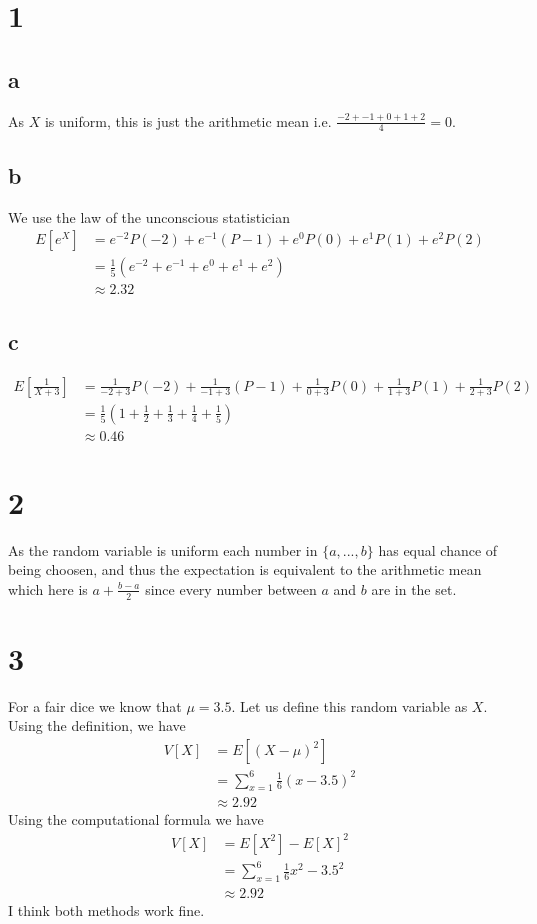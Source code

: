 \documentclass[10pt]{article}
\begin{document}
\section*{1}
\subsection*{a}
As $X$ is uniform, this is just the arithmetic mean i.e. $\frac{-2+-1+0+1+2}{4}=0.$

\subsection*{b}
We use the law of the unconscious statistician
\begin{align*}
    E[e^X] &= e^{-2}P(-2) + e^{-1}(P-1) + e^0P(0) + e^1P(1) + e^2P(2)\\
    &=\frac{1}{5}(e^{-2}+e^{-1}+e^0+e^1+e^2)\\
    &\approx 2.32
\end{align*}

\subsection*{c}

\begin{align*}
    E[\frac{1}{X+3}] &= \frac{1}{-2+3}P(-2) + \frac{1}{-1+3}(P-1) + \frac{1}{0+3}P(0) + \frac{1}{1+3}P(1) + \frac{1}{2+3}P(2)\\
    &=\frac{1}{5}(1 + \frac{1}{2}+\frac{1}{3}+\frac{1}{4}+\frac{1}{5})\\
    &\approx 0.46
\end{align*}

\section*{2}

As the random variable is uniform each number in $\{a,...,b\}$ has equal chance of being choosen, and thus the expectation is equivalent to the arithmetic mean which here is $a + \frac{b-a}{2}$ since every number between $a$ and $b$ are in the set.

\section*{3}

For a fair dice we know that $\mu=3.5.$ Let us define this random variable as $X.$
Using the definition, we have
\begin{align*}
    V[X] &= E[(X-\mu)^2]\\
    &= \sum_{x=1}^6\frac{1}{6}(x-3.5)^2\\
    &\approx2.92
\end{align*}
Using the computational formula we have
\begin{align*}
    V[X] &= E[X^2]-E[X]^2\\
    &= \sum_{x=1}^6\frac{1}{6}x^2-3.5^2\\
    &\approx2.92
\end{align*}
I think both methods work fine.
\end{document}
